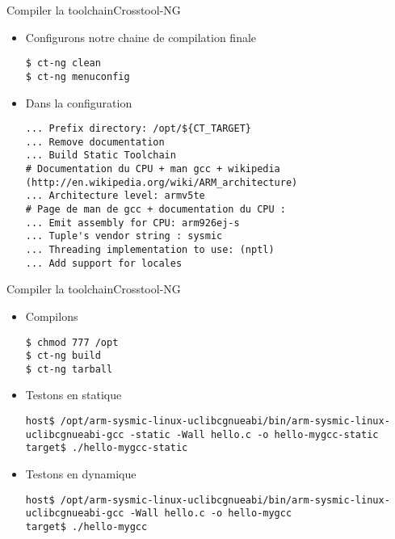 \begin{frame}[fragile=singleslide]{Compiler la toolchain}{Crosstool-NG}
  \begin{itemize}
  \item Configurons notre chaine de compilation finale
    \begin{lstlisting}
$ ct-ng clean
$ ct-ng menuconfig
       \end{lstlisting}
     \item Dans la configuration
       \begin{lstlisting}
... Prefix directory: /opt/${CT_TARGET}
... Remove documentation
... Build Static Toolchain
# Documentation du CPU + man gcc + wikipedia (http://en.wikipedia.org/wiki/ARM_architecture)
... Architecture level: armv5te
# Page de man de gcc + documentation du CPU :
... Emit assembly for CPU: arm926ej-s
... Tuple's vendor string : sysmic
... Threading implementation to use: (nptl)
... Add support for locales
       \end{lstlisting}
  \end{itemize}
\end{frame}

\begin{frame}[fragile=singleslide]{Compiler la toolchain}{Crosstool-NG}
  \begin{itemize}
     \item Compilons
       \begin{lstlisting}
$ chmod 777 /opt
$ ct-ng build
$ ct-ng tarball
       \end{lstlisting}
     \item Testons en statique
       \begin{lstlisting}[basicstyle=\ttfamily\scriptsize\color{colBasic}]
host$ /opt/arm-sysmic-linux-uclibcgnueabi/bin/arm-sysmic-linux-uclibcgnueabi-gcc -static -Wall hello.c -o hello-mygcc-static
target$ ./hello-mygcc-static
       \end{lstlisting}
     \item Testons en dynamique
       \begin{lstlisting}[basicstyle=\ttfamily\scriptsize\color{colBasic}]
host$ /opt/arm-sysmic-linux-uclibcgnueabi/bin/arm-sysmic-linux-uclibcgnueabi-gcc -Wall hello.c -o hello-mygcc
target$ ./hello-mygcc
	\end{lstlisting}
  \end{itemize}
\end{frame}

